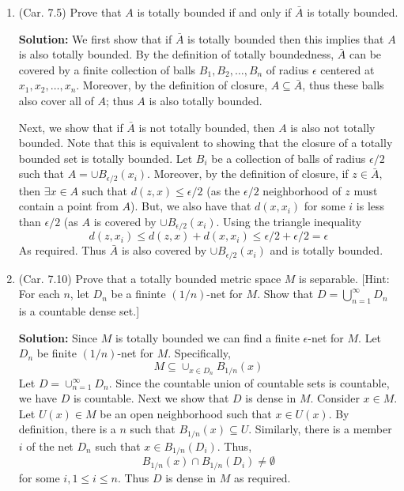 \documentclass{article}
\def\le{\leqslant}
\begin{document}
\begin{enumerate}

\item (Car. 7.5) Prove that $A$ is totally bounded if and only if $\bar{A}$ is totally bounded.

\textbf{Solution:} We first show that if $\bar{A}$ is totally bounded then this implies that $A$ is
also totally bounded. By the definition of totally boundedness, $\bar{A}$ can be covered by a finite
collection of balls $B_1,B_2,\ldots,B_n$ of radius $\epsilon$ centered at $x_1,x_2,\ldots,x_n$.
Moreover, by the definition of closure, $A \subseteq \bar{A}$, thus these balls also cover all of $A$; thus $A$ is also totally bounded.

Next, we show that if $\bar{A}$ is not totally bounded, then $A$ is also not totally bounded. 
Note that this is equivalent to showing that the closure of a totally bounded set is totally bounded.
Let $B_i$ be
a collection of balls of radius $\epsilon/2$ such that $A = \cup B_{\epsilon/2}(x_i)$. Moreover, by the
definition of closure, if $z \in \bar{A}$, then $\exists x \in A$ such that $d(z,x) \le \epsilon/2$ (as the
$\epsilon/2$ neighborhood of $z$ must contain a point from $A$). But, we also have that $d(x,x_i)$ for some $i$
is less than $\epsilon/2$ (as $A$ is covered by $\cup B_{\epsilon/2}(x_i)$. Using the triangle inequality
\[
d(z,x_i) \le d(z,x) + d(x,x_i) \le \epsilon/2 + \epsilon/2 = \epsilon
\]
As required. Thus $\bar{A}$ is also covered by $\cup B_{\epsilon/2}(x_i)$ and is totally bounded.

\item (Car. 7.10) Prove that a totally bounded metric space $M$ is separable. [Hint: For each $n$, let $D_n$ be a fininte $(1/n)$-net for $M$. Show that $D = \bigcup_{n=1}^{\infty} D_n$ is a countable dense set.]

\textbf{Solution:} Since $M$ is totally bounded we can find a finite $\epsilon$-net for $M$. 
Let $D_n$ be  finite $(1/n)$-net for $M$. Specifically,
\[
M \subseteq \cup_{x \in D_n} B_{1/n}(x)
\]
Let $D=\cup_{n=1}^{\infty} D_n$. Since the countable union of countable sets is countable, we have $D$ is countable.
Next we show that $D$ is dense in $M$. Consider $x\in M$. Let $U(x) \in M$ be an open neighborhood such that
$x\in U(x)$. By definition, there is a $n$ such that $B_{1/n}(x) \subseteq U$. Similarly, there is a member $i$ of
the net $D_n$ such that $x \in B_{1/n}(D_i)$. Thus, 
\[
B_{1/n}(x) \cap B_{1/n}(D_i) \ne \emptyset
\]
for some $i, 1 \le i \le n$. Thus $D$ is dense in $M$ as required.



\end{enumerate}
\end{document}
